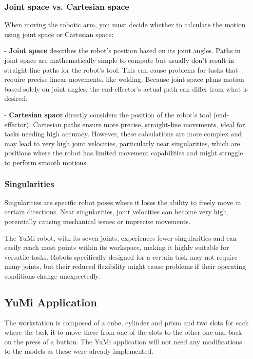 \documentclass[a4paper,12pt]{article}
\begin{document}
\subsubsection{Joint space vs. Cartesian space}
When moving the robotic arm, you must decide whether to calculate the motion using joint space or Cartesian space:

- \textbf{Joint space} describes the robot's position based on its joint angles. Paths in joint space are mathematically simple to compute but usually don't result in straight-line paths for the robot's tool. This can cause problems for tasks that require precise linear movements, like welding. Because joint space plans motion based solely on joint angles, the end-effector's actual path can differ from what is desired.

- \textbf{Cartesian space} directly considers the position of the robot's tool (end-effector). Cartesian paths ensure more precise, straight-line movements, ideal for tasks needing high accuracy. However, these calculations are more complex and may lead to very high joint velocities, particularly near singularities, which are positions where the robot has limited movement capabilities and might struggle to perform smooth motions.

\subsubsection{Singularities}
Singularities are specific robot poses where it loses the ability to freely move in certain directions. Near singularities, joint velocities can become very high, potentially causing mechanical issues or imprecise movements.

The YuMi robot, with its seven joints, experiences fewer singularities and can easily reach most points within its workspace, making it highly suitable for versatile tasks. Robots specifically designed for a certain task may not require many joints, but their reduced flexibility might cause problems if their operating conditions change unexpectedly.



\subsection{YuMi Application}
The workstation is composed of a cube, cylinder and prism and two slots for each where the task it to move these from one of the slots to the other one and back on the press of a button.
The YuMi application will not need any modifications to the models as these were already implemented.
\end{document}
